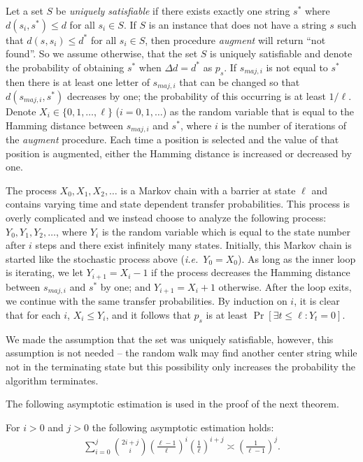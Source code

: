Let a set $S$ be {\em uniquely satisfiable} if there exists exactly one string $s^*$ where $d(s_i, s^*) \leq d$ for all $s_i \in S$. If $S$ is an instance that does not have a string $s$ such that $d(s, s_i) \leq d^*$ for all $s_i \in S$, then procedure {\em augment} will return ``not found''.  So we assume otherwise, that the set $S$ is uniquely satisfiable and denote the probability of obtaining $s^*$ when $\Delta d = d^*$ as $p_s$. If $s_{maj, i}$ is not equal to $s^*$ then there is at least one letter of $s_{maj, i}$ that can be changed so that $d(s_{maj, i}, s^*)$ decreases by one; the probability of this occurring is at least $1/\ell$.  Denote $X_i \in \{0, 1, \ldots, \ell\}$ ($i = 0, 1, \ldots$) as the random variable that is equal to the Hamming distance between $s_{maj, i}$ and $s^*$, where $i$ is the number of iterations of the {\em augment} procedure.  Each time a position is selected and the value of that position is augmented, either the Hamming distance is increased or decreased by one.

The process $X_0, X_1, X_2, \ldots$ is a Markov chain with a barrier at state $\ell$ and contains varying time and state dependent transfer probabilities. This process is overly complicated and we instead choose to analyze the following process: $Y_0, Y_1, Y_2, \ldots$,  where $Y_i$ is the random variable which is equal to the state number after $i$ steps and there exist infinitely many states.  Initially, this Markov chain is started like the stochastic process above ({\em i.e.}\ $Y_0 = X_0$).  As long as the inner loop is iterating, we let $Y_{i+1} = X_i - 1$  if the process decreases the Hamming distance between $s_{maj, i}$ and $s^*$ by one; and $Y_{i+1} = X_i + 1$ otherwise.  After the loop exits, we continue with the same transfer probabilities. By induction on $i$, it is clear that for each $i$, $X_i \leq Y_i$, and it follows that $p_s$ is at least $\Pr[\exists t \leq \ell : Y_t = 0]$.    

We made the assumption that the set was uniquely satisfiable, however, this assumption is not needed -- the random walk may find another center string while not in the terminating state but this possibility only increases the probability the algorithm terminates.

The following asymptotic estimation is used in the proof of the next theorem. 

\begin{fact} \label{fact1} For $i > 0$ and $j > 0$ the following asymptotic estimation holds: \begin{eqnarray}\label{eqn1}\sum_{i = 0}^{j} {{2i + j}\choose{i}} \left( \frac{\ell - 1}{\ell}\right)^{i} \left( \frac{1}{\ell}\right)^{i + j} \asymp \left( \frac{1}{ \ell - 1}\right)^j.\end{eqnarray} \end{fact}

